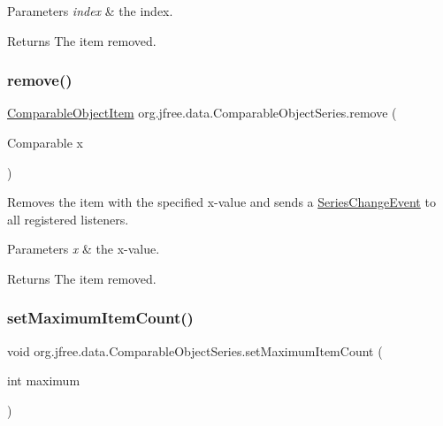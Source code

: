 \begin{DoxyParams}{Parameters}
{\em index} & the index.\\
\hline
\end{DoxyParams}
\begin{DoxyReturn}{Returns}
The item removed. 
\end{DoxyReturn}
\mbox{\label{classorg_1_1jfree_1_1data_1_1_comparable_object_series_a114e1cab4397a3c31881a3dedc88f6dc}} 
\subsubsection{\texorpdfstring{remove()}{remove()}\hspace{0.1cm}{\footnotesize\ttfamily [2/2]}}
{\footnotesize\ttfamily \mbox{\hyperlink{classorg_1_1jfree_1_1data_1_1_comparable_object_item}{Comparable\+Object\+Item}} org.\+jfree.\+data.\+Comparable\+Object\+Series.\+remove (\begin{DoxyParamCaption}\item[{Comparable}]{x }\end{DoxyParamCaption})}

Removes the item with the specified x-\/value and sends a \mbox{\hyperlink{}{Series\+Change\+Event}} to all registered listeners.


\begin{DoxyParams}{Parameters}
{\em x} & the x-\/value.\\
\hline
\end{DoxyParams}
\begin{DoxyReturn}{Returns}
The item removed. 
\end{DoxyReturn}
\mbox{\label{classorg_1_1jfree_1_1data_1_1_comparable_object_series_a77eb1fe6cae39738587baf49592266ab}} 
\subsubsection{\texorpdfstring{set\+Maximum\+Item\+Count()}{setMaximumItemCount()}}
{\footnotesize\ttfamily void org.\+jfree.\+data.\+Comparable\+Object\+Series.\+set\+Maximum\+Item\+Count (\begin{DoxyParamCaption}\item[{int}]{maximum }\end{DoxyParamCaption})}

